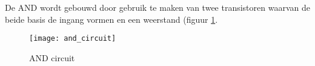 De AND wordt gebouwd door gebruik te maken van twee transistoren waarvan de beide basis de ingang vormen en een weerstand (figuur \ref{circuit:and}.

\begin{figure}[h]
\texttt{[image: and\_circuit]}
\centering
\caption{AND circuit}
\label{circuit:and}
\end{figure}

